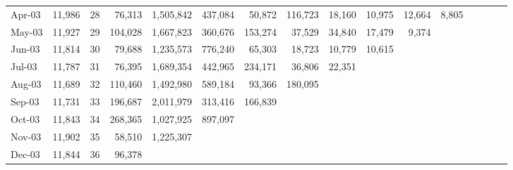 \begin{exercises}
\begin{table}
\begin{center}
\begin{tabular}{lrcrrrrrrrrrrrrr}
    Apr-03 &     11,986 &         28 &     76,313 &  1,505,842 &    437,084 &     50,872 &    116,723 &     18,160 &     10,975 &     12,664 &      8,805 &            &            &            &            \\
    May-03 &     11,927 &         29 &    104,028 &  1,667,823 &    360,676 &    153,274 &     37,529 &     34,840 &     17,479 &      9,374 &            &            &            &            &            \\
    Jun-03 &     11,814 &         30 &     79,688 &  1,235,573 &    776,240 &     65,303 &     18,723 &     10,779 &     10,615 &            &            &            &            &            &            \\
    Jul-03 &     11,787 &         31 &     76,395 &  1,689,354 &    442,965 &    234,171 &     36,806 &     22,351 &            &            &            &            &            &            &
    \\
    Aug-03 &     11,689 &         32 &    110,460 &  1,492,980 &    589,184 &     93,366 &    180,095 &            &            &            &            &            &            &            &            \\
    Sep-03 &     11,731 &         33 &    196,687 &  2,011,979 &    313,416 &    166,839 &            &            &            &            &            &            &            &            &            \\
    Oct-03 &     11,843 &         34 &    268,365 &  1,027,925 &    897,097 &            &            &            &            &            &            &            &            &            &            \\
    Nov-03 &     11,902 &         35 &     58,510 &  1,225,307 &            &            &            &            &            &            &            &            &            &            &            \\
    Dec-03 &     11,844 &         36 &     96,378 &            &            &            &            &            &            &            &            &            &            &            &            \\
\hline
\end{tabular}
\end{center}
\end{table}

\end{exercises}
